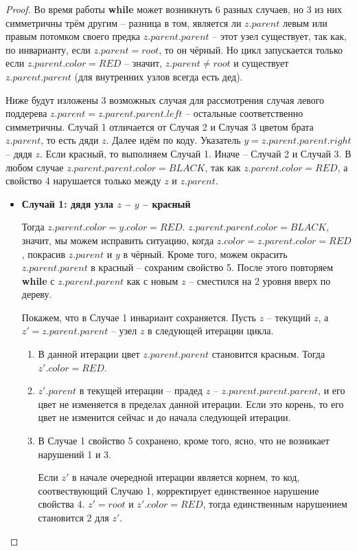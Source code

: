 \documentclass[a4paper,12pt]{article}
\begin{document}
\begin{proof}
    Во время работы \textbf{while} может возникнуть 6 разных случаев, но 3 из них симметричны трём другим -- разница в том, является ли $z.parent$ левым или правым потомком своего предка $z.parent.parent$ -- этот узел существует, так как, по инварианту, если $z.parent = root$, то он чёрный. Но цикл запускается только если $z.parent.color = RED$ -- значит, $z.parent \neq root$ и существует $z.parent.parent$ (для внутренних узлов всегда есть дед).
    
    Ниже будут изложены 3 возможных случая для рассмотрения случая левого поддерева $z.parent = z.parent.parent.left$ -- остальные соответственно симметричны. Случай 1 отличается от Случая 2 и Случая 3 цветом брата $z.parent$, то есть дяди $z$. Далее идём по коду. Указатель $y = z.parent.parent.right$ -- дядя $z$. Если красный, то выполняем Случай 1. Иначе -- Случай 2 и Случай 3. В любом случае $z.parent.parent.color = BLACK$, так как $z.parent.color = RED$, а свойство 4 нарушается только между $z$ и $z.parent$.
    
    \begin{itemize}
        \item \textbf{Случай 1: дядя узла $z$ -- $y$ -- красный}
        
        Тогда $z.parent.color = y.color = RED$. $z.parent.parent.color = BLACK$, значит, мы можем исправить ситуацию, когда $z.color = z.parent.color = RED$, покрасив $z.parent$ и $y$ в чёрный. Кроме того, можем окрасить $z.parent.parent$ в красный -- сохраним свойство 5. После этого повторяем \textbf{while} с $z.parent.parent$ как с новым $z$ -- сместился на 2 уровня вверх по дереву.
        
        Покажем, что в Случае 1 инвариант сохраняется. Пусть $z$ -- текущий $z$, а $z' = z.parent.parent$ -- узел $z$ в следующей итерации цикла.
        \begin{enumerate}
            \item В данной итерации цвет $z.parent.parent$ становится красным. Тогда $z'.color = RED$.
            \item $z'.parent$ в текущей итерации -- прадед $z$ -- $z.parent.parent.parent$, и его цвет не изменяется в пределах данной итерации. Если это корень, то его цвет не изменится сейчас и до начала следующей итерации.
            \item В Случае 1 свойство 5 сохранено, кроме того, ясно, что не возникает нарушений 1 и 3.
            
            Если $z'$ в начале очередной итерации является корнем, то код, соотвествующий Случаю 1, корректирует единственное нарушение свойства 4. $z' = root$ и $z'.color = RED$, тогда единственным нарушением становится 2 для $z'$.
            

\end{enumerate}
\end{itemize}
\end{proof}
\end{document}
